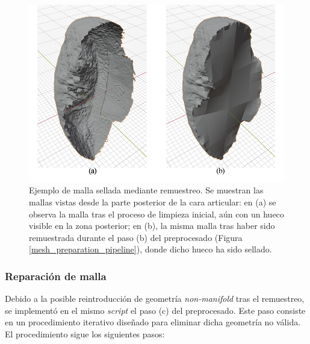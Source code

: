 \begin{figure}[h]
    \centering
    \includegraphics[width=\linewidth]{figures/4_materials-methods/remesh_hole_filled_example.png}
    \caption[Ejemplo de malla sellada por remuestreo]{Ejemplo de malla sellada mediante remuestreo. Se muestran las mallas vistas desde la parte posterior de la cara articular: en (a) se observa la malla tras el proceso de limpieza inicial, aún con un hueco visible en la zona posterior; en (b), la misma malla tras haber sido remuestrada durante el paso (b) del preprocesado (Figura \ref{mesh_preparation_pipeline}), donde dicho hueco ha sido sellado.}
    \label{remesh_hole_example}
\end{figure}

\subsubsection{Reparación de malla}
\label{section4:data_repair}
Debido a la posible reintroducción de geometría \textit{non-manifold} tras el remuestreo, se implementó en el mismo \textit{script} el paso (c) del preprocesado. Este paso consiste en un procedimiento iterativo diseñado para eliminar dicha geometría no válida. El procedimiento sigue los siguientes pasos:


